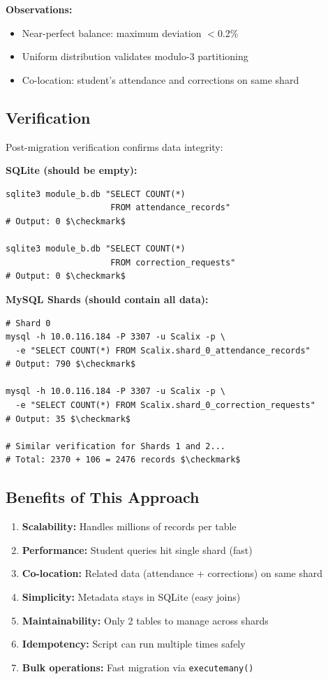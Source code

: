\documentclass[conference]{IEEEtran}
\begin{document}
\textbf{Observations:}
\begin{itemize}
    \item Near-perfect balance: maximum deviation $<$0.2\%
    \item Uniform distribution validates modulo-3 partitioning
    \item Co-location: student's attendance and corrections on same shard
\end{itemize}

\subsection{Verification}

Post-migration verification confirms data integrity:

\textbf{SQLite (should be empty):}
\begin{lstlisting}
sqlite3 module_b.db "SELECT COUNT(*) 
                     FROM attendance_records"
# Output: 0 $\checkmark$

sqlite3 module_b.db "SELECT COUNT(*) 
                     FROM correction_requests"
# Output: 0 $\checkmark$
\end{lstlisting}

\textbf{MySQL Shards (should contain all data):}
\begin{lstlisting}
# Shard 0
mysql -h 10.0.116.184 -P 3307 -u Scalix -p \
  -e "SELECT COUNT(*) FROM Scalix.shard_0_attendance_records"
# Output: 790 $\checkmark$

mysql -h 10.0.116.184 -P 3307 -u Scalix -p \
  -e "SELECT COUNT(*) FROM Scalix.shard_0_correction_requests"
# Output: 35 $\checkmark$

# Similar verification for Shards 1 and 2...
# Total: 2370 + 106 = 2476 records $\checkmark$
\end{lstlisting}

\subsection{Benefits of This Approach}

\begin{enumerate}
    \item \textbf{Scalability:} Handles millions of records per table
    \item \textbf{Performance:} Student queries hit single shard (fast)
    \item \textbf{Co-location:} Related data (attendance + corrections) on same shard
    \item \textbf{Simplicity:} Metadata stays in SQLite (easy joins)
    \item \textbf{Maintainability:} Only 2 tables to manage across shards
    \item \textbf{Idempotency:} Script can run multiple times safely
    \item \textbf{Bulk operations:} Fast migration via \texttt{executemany()}
\end{enumerate}
\end{document}
